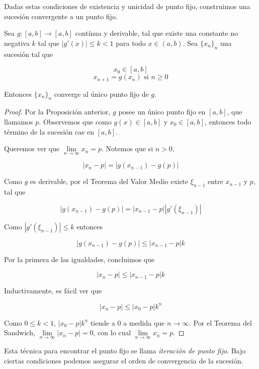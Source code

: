 Dadas estas condiciones de existencia y unicidad de punto fijo, construimos una sucesión convergente a un punto fijo.

\begin{propo}
\label{propo:ptofijo}
Sea $g:[a, b] \to [a, b]$ contínua y derivable, tal que existe una constante no negativa $k$ tal que $|g'(x)| \leq k < 1$ para todo $x \in (a, b)$. Sea $\{x_n\}_n$ una sucesión tal que 

\[x_0 \in [a, b]\]
\[x_{n + 1} = g(x_n) \text{ si }n \geq 0\] 

Entonces $\{x_n\}_n$ converge al único punto fijo de $g$.

\begin{proof}
Por la Proposición anterior, $g$ posee un único punto fijo en $[a, b]$, que llamamos $p$. Observemos que como $g(x) \in [a, b]$ y $x_0 \in [a, b]$, entonces todo término de la sucesión cae en $[a, b]$.

Queremos ver que $\lim \limits_{n \to \infty} x_n = p$. Notemos que si $n > 0$,

\[|x_n - p| = |g(x_{n - 1}) - g(p)|\]

Como $g$ es derivable, por el Teorema del Valor Medio existe $\xi_{n - 1}$ entre $x_{n - 1}$ y $p$, tal que

\[|g(x_{n - 1}) - g(p)| = \left|x_{n - 1} - p\right| \left|g'(\xi_{n - 1})\right|\]

Como $\left|g'(\xi_{n - 1})\right| \leq k$ entonces

\[|g(x_{n - 1}) - g(p)| \leq \left|x_{n - 1} - p\right| k\]

Por la primera de las igualdades, concluimos que

\[|x_n - p| \leq \left|x_{n - 1} - p\right| k\]

Inductivamente, es fácil ver que

\[|x_n - p| \leq \left|x_0 - p\right| k^n\]

Como $0 \leq k < 1$, $\left|x_0 - p\right| k^n$ tiende a 0 a medida que $n \to \infty$. Por el Teorema del Sandwich, $\lim \limits_{n \to \infty} |x_n - p| = 0$, con lo cual $\lim \limits_{n \to \infty} x_n = p$.

\end{proof}
\end{propo}

Esta técnica para encontrar el punto fijo se llama \textit{iteración de punto fijo}. Bajo ciertas condiciones podemos asegurar el orden de convergencia de la sucesión.

